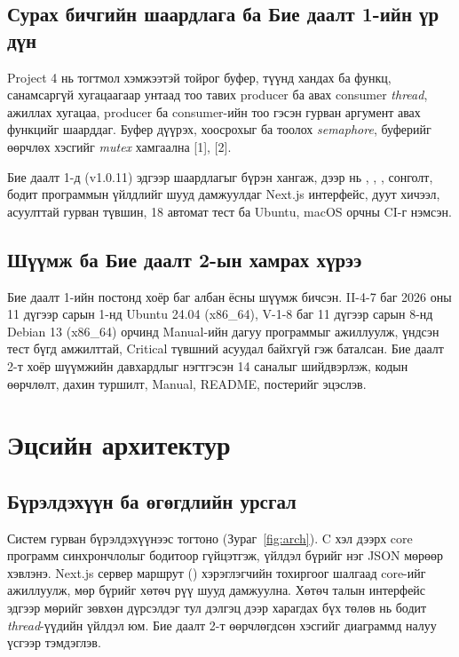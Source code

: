 \documentclass[12pt,a4paper]{article}
\newcommand{\term}[1]{\textit{#1}} %
\begin{document}
\subsection{Сурах бичгийн шаардлага ба Бие даалт 1-ийн үр дүн}
Project 4 нь тогтмол хэмжээтэй тойрог буфер, түүнд хандах  ба  функц, санамсаргүй хугацаагаар унтаад тоо тавих producer ба авах consumer \term{thread}, ажиллах хугацаа, producer ба consumer-ийн тоо гэсэн гурван аргумент авах  функцийг шаарддаг. Буфер дүүрэх, хоосрохыг  ба  тоолох \term{semaphore}, буферийг өөрчлөх хэсгийг \term{mutex} хамгаална [1], [2].

Бие даалт 1-д (v1.0.11) эдгээр шаардлагыг бүрэн хангаж, дээр нь , , ,  сонголт, бодит программын үйлдлийг шууд дамжуулдаг Next.js интерфейс, дуут хичээл, асуулттай гурван түвшин, 18 автомат тест ба Ubuntu, macOS орчны CI-г нэмсэн.

\subsection{Шүүмж ба Бие даалт 2-ын хамрах хүрээ}
Бие даалт 1-ийн постонд хоёр баг албан ёсны шүүмж бичсэн. II-4-7 баг 2026 оны 11 дүгээр сарын 1-нд Ubuntu 24.04 (x86\_64), V-1-8 баг 11 дүгээр сарын 8-нд Debian 13 (x86\_64) орчинд Manual-ийн дагуу программыг ажиллуулж, үндсэн тест бүгд амжилттай, Critical түвшний асуудал байхгүй гэж баталсан. Бие даалт 2-т хоёр шүүмжийн давхардлыг нэгтгэсэн 14 саналыг шийдвэрлэж, кодын өөрчлөлт, дахин туршилт, Manual, README, постерийг эцэслэв.

\section{Эцсийн архитектур}

\subsection{Бүрэлдэхүүн ба өгөгдлийн урсгал}
Систем гурван бүрэлдэхүүнээс тогтоно (Зураг~\ref{fig:arch}). C хэл дээрх core программ синхрончлолыг бодитоор гүйцэтгэж, үйлдэл бүрийг нэг JSON мөрөөр хэвлэнэ. Next.js сервер маршрут () хэрэглэгчийн тохиргоог шалгаад core-ийг ажиллуулж, мөр бүрийг хөтөч рүү шууд дамжуулна. Хөтөч талын интерфейс эдгээр мөрийг зөвхөн дүрсэлдэг тул дэлгэц дээр харагдах бүх төлөв нь бодит \term{thread}-үүдийн үйлдэл юм. Бие даалт 2-т өөрчлөгдсөн хэсгийг диаграммд налуу үсгээр тэмдэглэв.
\end{document}
